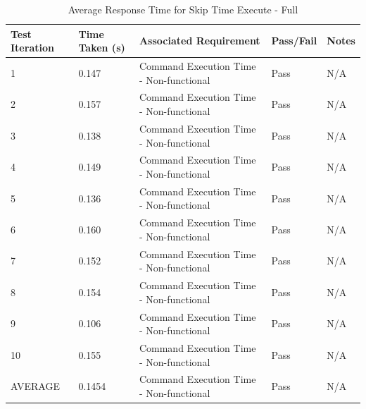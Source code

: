 \begin{table}[H]
  \centering
  \caption{Average Response Time for Skip Time Execute - Full}
  \label{tab:avgResTimeFullSTE}
  \begin{tabularx}{\linewidth}{XlXlX}
    \toprule
    Test Iteration & Time Taken (s) & Associated Requirement & Pass/Fail & Notes \\
    \midrule
    1  & 0.147 & Command Execution Time - Non-functional & Pass & N/A \\
    2  & 0.157 & Command Execution Time - Non-functional & Pass & N/A \\
    3  & 0.138 & Command Execution Time - Non-functional & Pass & N/A \\
    4  & 0.149 & Command Execution Time - Non-functional & Pass & N/A \\
    5  & 0.136 & Command Execution Time - Non-functional & Pass & N/A \\
    6  & 0.160 & Command Execution Time - Non-functional & Pass & N/A \\
    7  & 0.152 & Command Execution Time - Non-functional & Pass & N/A \\
    8  & 0.154 & Command Execution Time - Non-functional & Pass & N/A \\
    9  & 0.106 & Command Execution Time - Non-functional & Pass & N/A \\
    10 & 0.155 & Command Execution Time - Non-functional & Pass & N/A \\
    \bottomrule
    AVERAGE & 0.1454 & Command Execution Time - Non-functional & Pass & N/A \\
  \end{tabularx}
\end{table}
 
